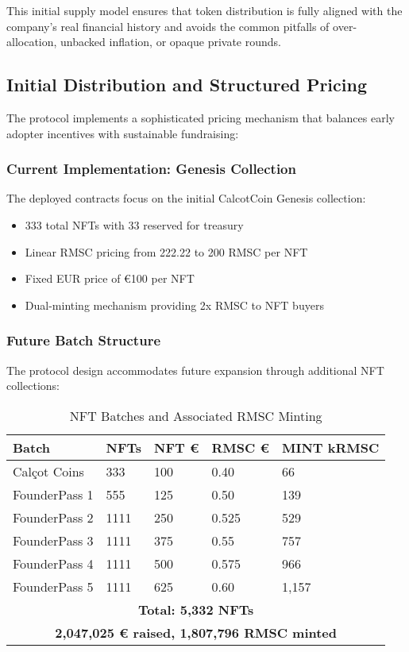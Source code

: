 \documentclass[conference]{IEEEtran}
\begin{document}
This initial supply model ensures that token distribution is fully aligned with the company’s real financial history and avoids the common pitfalls of over-allocation, unbacked inflation, or opaque private rounds.

\subsection{Initial Distribution and Structured Pricing}

The protocol implements a sophisticated pricing mechanism that balances early adopter incentives with sustainable fundraising:

\subsubsection{Current Implementation: Genesis Collection}

The deployed contracts focus on the initial CalcotCoin Genesis collection:
\begin{itemize}
    \item 333 total NFTs with 33 reserved for treasury
    \item Linear RMSC pricing from 222.22 to 200 RMSC per NFT
    \item Fixed EUR price of €100 per NFT
    \item Dual-minting mechanism providing 2x RMSC to NFT buyers
\end{itemize}

\subsubsection{Future Batch Structure}

The protocol design accommodates future expansion through additional NFT collections:

\begin{table}[ht]
\caption{NFT Batches and Associated RMSC Minting}
\centering
\scriptsize
\begin{tabular}{|p{1.5cm}|p{0.6cm}|p{0.7cm}|p{0.7cm}|p{0.7cm}|}
\hline
\textbf{Batch} & \textbf{NFTs} & \textbf{NFT €} & \textbf{RMSC €} & \textbf{MINT kRMSC} \\
\hline
Calçot Coins     & 333  & 100  & 0.40  & 66  \\
FounderPass 1    & 555  & 125  & 0.50  & 139  \\
FounderPass 2    & 1111 & 250  & 0.525 & 529  \\
FounderPass 3    & 1111 & 375  & 0.55  & 757  \\
FounderPass 4    & 1111 & 500  & 0.575 & 966  \\
FounderPass 5    & 1111 & 625  & 0.60  & 1,157  \\
\hline
\multicolumn{5}{|c|}{\textbf{Total: 5,332 NFTs}} \\
\multicolumn{5}{|c|}{\textbf{2,047,025 € raised, 1,807,796 RMSC minted}} \\
\hline
\end{tabular}
\end{table}
\end{document}
